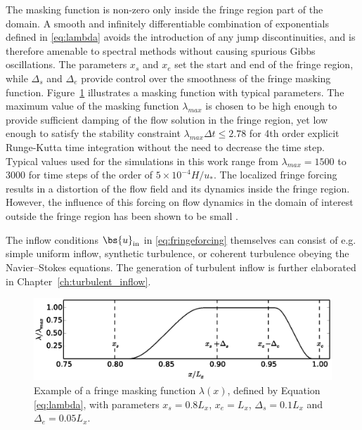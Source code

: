 The masking function is non-zero only inside the fringe region part of the domain. A smooth and infinitely differentiable combination of exponentials defined in \eqref{eq:lambda} avoids the introduction of any jump discontinuities, and is therefore amenable to spectral methods without causing spurious Gibbs oscillations. The parameters $x_s$ and $x_e$ set the start and end of the fringe region, while $\Delta_s$ and $\Delta_e$ provide control over the smoothness of the fringe masking function. Figure~\ref{fig:lambda} illustrates a masking function with typical parameters. The maximum value of the masking function $\lambda_{max}$ is chosen to be high enough to provide sufficient damping of the flow solution in the fringe region, yet low enough to satisfy the stability constraint $\lambda_{max}\Delta t \le 2.78$ for 4th order explicit Runge-Kutta time integration \citep{schlatter2005windowing} without the need to decrease the time step. Typical values used for the simulations in this work range from $\lambda_{max} = 1 500$ to $3 000$ for time steps of the order of $5 \times 10^{-4} H/u_*$. The localized fringe forcing results in a distortion of the flow field and its dynamics inside the fringe region. However, the influence of this forcing on flow dynamics in the domain of interest outside the fringe region has been shown to be small \citep{nordstrom1999fringe}.

The inflow conditions $\bs{u}_{\text{in}}$ in \eqref{eq:fringeforcing} themselves can consist of e.g. simple uniform inflow, synthetic turbulence, or coherent turbulence obeying the Navier--Stokes equations. The generation of turbulent inflow is further elaborated in Chapter~\ref{ch:turbulent_inflow}. 

\begin{figure}[t]
	\centering
	\includegraphics[width = \textwidth,trim= 0cm 4.4cm 0cm 5cm,clip]{chapters/methodology/lambda_fringefunction.eps}
	\caption[Example of a fringe masking function $\lambda(x)$.]{Example of a fringe masking function $\lambda(x)$, defined by Equation \eqref{eq:lambda}, with parameters $x_{s} = 0.8L_x$, $x_{e} = L_x$, $\Delta_{s} = 0.1L_x$ and $\Delta_{e} = 0.05L_x$.}
	\label{fig:lambda}
\end{figure}	



